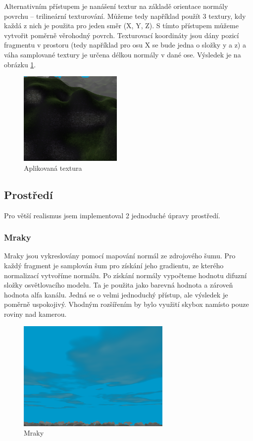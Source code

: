 \documentclass[12pt,a4paper,titlepage,final]{report}
\begin{document}
Alternativním přístupem je nanášení textur na základě orientace normály povrchu -- trilineární texturování. Můžeme tedy například použít 3 textury, kdy každá z nich je použita pro jeden směr (X, Y, Z). S tímto přístupem můžeme vytvořit poměrně věrohodný povrch. Texturovací koordináty jsou dány pozicí fragmentu v prostoru (tedy například pro osu X se bude jedna o složky y a z) a váha samplované textury je určena délkou normály v dané ose. Výsledek je na obrázku \ref{fig:tex}.

\begin{figure}[H]
    \centering
    \includegraphics[scale=1]{images/tex.png}
    \caption{Aplikovaná textura}
    \label{fig:tex}
\end{figure}

\subsection{Prostředí}
Pro větší realismus jsem implementoval 2 jednoduché úpravy prostředí.
\subsubsection{Mraky}
Mraky jsou vykreslovány pomocí mapování normál ze zdrojového šumu. Pro každý fragment je samplován šum pro získání jeho gradientu, ze kterého normalizací vytvoříme normálu. Po získání normály vypočteme hodnotu difuzní složky osvětlovacího modelu. Ta je použita jako barevná hodnota a zároveň hodnota alfa kanálu. Jedná se o velmi jednoduchý přístup, ale výsledek je poměrně uspokojivý. Vhodným rozšířením by bylo využití skybox namísto pouze roviny nad kamerou.

\begin{figure}[H]
    \centering
    \includegraphics[scale=0.7]{images/clouds.png}
    \caption{Mraky}
    \label{fig:clouds}
\end{figure}
\end{document}
